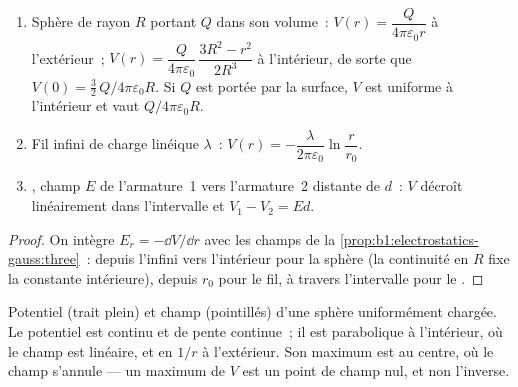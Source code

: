 \begin{proposition}\label{prop:b1:potential-capacitors:classic}
\begin{enumerate}
  \item Sphère de rayon $R$ portant $Q$ dans son volume~: $V(r) = \dfrac{Q}{4\pi\varepsilon_0r}$
        à l'extérieur~; $V(r) = \dfrac{Q}{4\pi\varepsilon_0}\,\dfrac{3R^2 - r^2}{2R^3}$
        à l'intérieur, de sorte que $V(0) = \tfrac32\,Q/4\pi\varepsilon_0R$. Si $Q$ est
        portée par la surface, $V$ est uniforme à l'intérieur et vaut $Q/4\pi\varepsilon_0R$.
  \item Fil infini de charge linéique $\lambda$~: $V(r) = -\dfrac{\lambda}{2\pi\varepsilon_0}\ln\dfrac{r}{r_0}$.
  \item {}, champ $E$ de l'armature~1 vers l'armature~2 distante
        de $d$~: $V$ décroît linéairement dans l'intervalle et $V_1 - V_2 = Ed$.
\end{enumerate}
\end{proposition}

\begin{proof}
On intègre $E_r = -\dd V/\dd r$ avec les champs de la
\cref{prop:b1:electrostatics-gauss:three}~: depuis l'infini vers l'intérieur
pour la sphère (la continuité en $R$ fixe la constante intérieure), depuis
$r_0$ pour le fil, à travers l'intervalle pour le .
\end{proof}

\begin{omfigure}

{\small Potentiel (trait plein) et champ (pointillés) d'une sphère
uniformément chargée. Le potentiel est continu et de pente continue~; il est
parabolique à l'intérieur, où le champ est linéaire, et en $1/r$ à
l'extérieur. Son maximum est au centre, où le champ s'annule --- un maximum de
$V$ est un point de champ nul, et non l'inverse.}
\end{omfigure}


